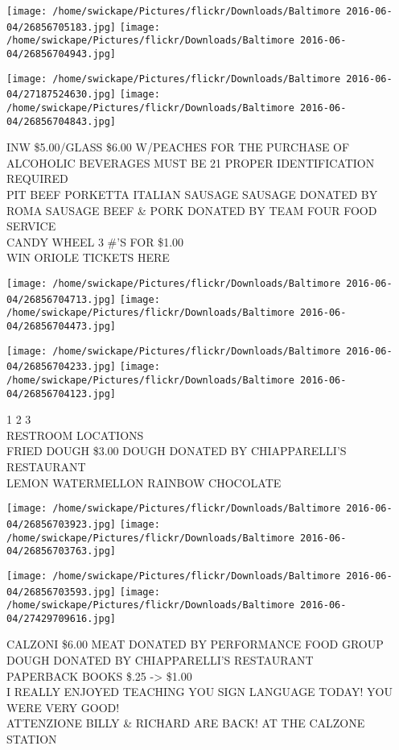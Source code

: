 \documentclass[10pt,letterpaper]{article}
\begin{document}
\texttt{[image: /home/swickape/Pictures/flickr/Downloads/Baltimore 2016-06-04/26856705183.jpg]}
\texttt{[image: /home/swickape/Pictures/flickr/Downloads/Baltimore 2016-06-04/26856704943.jpg]}

\texttt{[image: /home/swickape/Pictures/flickr/Downloads/Baltimore 2016-06-04/27187524630.jpg]}
\texttt{[image: /home/swickape/Pictures/flickr/Downloads/Baltimore 2016-06-04/26856704843.jpg]}

INW \$5.00/GLASS \$6.00 W/PEACHES FOR THE PURCHASE OF ALCOHOLIC BEVERAGES MUST BE 21 PROPER IDENTIFICATION REQUIRED\\
PIT BEEF PORKETTA ITALIAN SAUSAGE SAUSAGE DONATED BY ROMA SAUSAGE BEEF \& PORK DONATED BY TEAM FOUR FOOD SERVICE\\
CANDY WHEEL 3 \#'S FOR \$1.00\\
WIN ORIOLE TICKETS HERE\\
\pagebreak

\texttt{[image: /home/swickape/Pictures/flickr/Downloads/Baltimore 2016-06-04/26856704713.jpg]}
\texttt{[image: /home/swickape/Pictures/flickr/Downloads/Baltimore 2016-06-04/26856704473.jpg]}

\texttt{[image: /home/swickape/Pictures/flickr/Downloads/Baltimore 2016-06-04/26856704233.jpg]}
\texttt{[image: /home/swickape/Pictures/flickr/Downloads/Baltimore 2016-06-04/26856704123.jpg]}

1 2 3\\
RESTROOM LOCATIONS\\
FRIED DOUGH \$3.00 DOUGH DONATED BY CHIAPPARELLI'S RESTAURANT\\
LEMON WATERMELLON RAINBOW CHOCOLATE\\
\pagebreak

\texttt{[image: /home/swickape/Pictures/flickr/Downloads/Baltimore 2016-06-04/26856703923.jpg]}
\texttt{[image: /home/swickape/Pictures/flickr/Downloads/Baltimore 2016-06-04/26856703763.jpg]}

\texttt{[image: /home/swickape/Pictures/flickr/Downloads/Baltimore 2016-06-04/26856703593.jpg]}
\texttt{[image: /home/swickape/Pictures/flickr/Downloads/Baltimore 2016-06-04/27429709616.jpg]}

CALZONI \$6.00 MEAT DONATED BY PERFORMANCE FOOD GROUP DOUGH DONATED BY CHIAPPARELLI'S RESTAURANT\\
PAPERBACK BOOKS \$.25 {-}> \$1.00\\
I REALLY ENJOYED TEACHING YOU SIGN LANGUAGE TODAY!  YOU WERE VERY GOOD!\\
ATTENZIONE BILLY \& RICHARD ARE BACK! AT THE CALZONE STATION\\
\pagebreak
\end{document}
